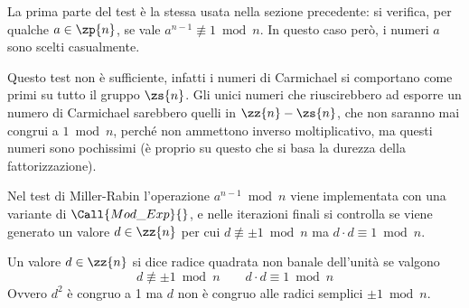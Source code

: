 La prima parte del test è la stessa usata nella sezione precedente: si verifica, per qualche $
a \in \zp{n} 
$, se vale $
a^{n-1} \not\equiv 1 \bmod n 
$.
In questo caso però, i numeri $a$ sono scelti casualmente.

Questo test non è sufficiente, infatti i numeri di Carmichael si comportano come primi su tutto il gruppo $
\zs{n} 
$.
Gli unici numeri che riuscirebbero ad esporre un numero di Carmichael sarebbero quelli in $
\zz{n} - \zs{n} 
$, che non saranno mai congrui a $1 \bmod n $, perché non ammettono inverso moltiplicativo,
ma questi numeri sono pochissimi (è proprio su questo che si basa la durezza della fattorizzazione).

Nel test di Miller-Rabin l'operazione $
a^{n-1} \bmod n 
$ viene implementata con una variante di $
\Call{Mod\_Exp}{}
$, e nelle iterazioni finali si controlla se viene generato un valore $
d \in \zz{n} 
$ per cui $
d \not\equiv \pm 1 \bmod n 
$ ma $
d  \cdot d \equiv 1 \bmod n 
$.

\begin{definition}
    \label{def:radicenonbanale}
    Un valore $
    d \in \zz{n} 
    $ si dice radice quadrata non banale dell'unità se valgono
    \begin{equation*}
        d \not\equiv \pm 1 \bmod n 
        \quad
        \quad
        d  \cdot d \equiv 1 \bmod n 
    \end{equation*}
    Ovvero $d^2$ è congruo a 1 ma $d$ non è congruo alle radici semplici $\pm 1 \bmod n $.
\end{definition}

